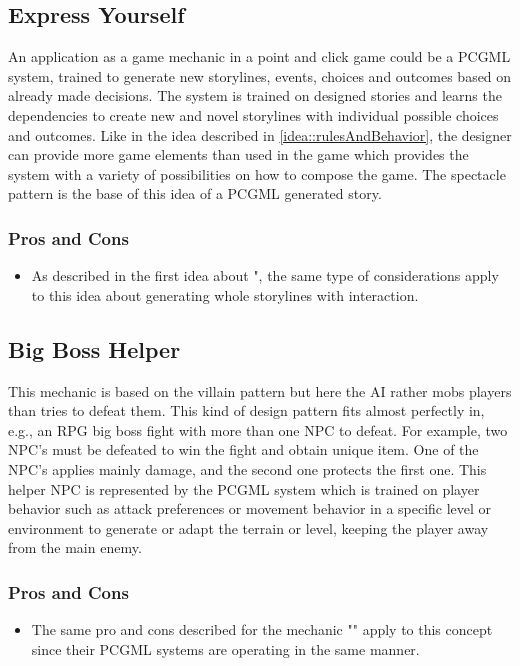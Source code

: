 \documentclass[MGS,Master,english]{twbook}%
\begin{document}
\subsection{Express Yourself} \label{idea::expressYourself}
An application as a game mechanic in a point and click game could be a PCGML system, trained to generate new storylines, events, choices and outcomes based on already made decisions. The system is trained on designed stories and learns the dependencies to create new and novel storylines with individual possible choices and outcomes. Like in the idea described in \ref{idea::rulesAndBehavior}, the designer can provide more game elements than used in the game which provides the system with a variety of possibilities on how to compose the game. The spectacle pattern is the base of this idea of a PCGML generated story.

\subsubsection{Pros and Cons}
\begin{itemize}
	\item As described in the first idea about ", the same type of considerations apply to this idea about generating whole storylines with interaction.
\end{itemize}

\subsection{Big Boss Helper} \label{idea::bigBossHelper}
This mechanic is based on the villain pattern but here the AI rather mobs players than tries to defeat them. This kind of design pattern fits almost perfectly in, e.g., an RPG big boss fight with more than one \ac{NPC} to defeat. For example, two NPC’s must be defeated to win the fight and obtain unique item. One of the NPC's applies mainly damage, and the second one protects the first one. This helper NPC is represented by the PCGML system which is trained on player behavior such as attack preferences or movement behavior in a specific level or environment to generate or adapt the terrain or level, keeping the player away from the main enemy.

\subsubsection{Pros and Cons}
\begin{itemize}
	\item The same pro and cons described for the mechanic "" apply to this concept since their PCGML systems are operating in the same manner.
\end{itemize}
\end{document}
